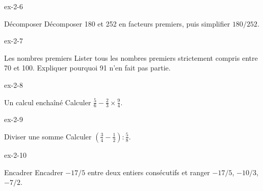 \begin{blocLivre}{ex-2-6}\begin{exercice}[2]{Décomposer}
Décomposer 180 et 252 en facteurs premiers, puis simplifier $180/252$.
\label{fig-ex-2-6}
\end{exercice}\end{blocLivre}
\begin{blocLivre}{ex-2-7}\begin{exercice}[2]{Les nombres premiers}
Lister tous les nombres premiers strictement compris entre 70 et 100. Expliquer pourquoi 91 n’en fait pas partie.
\end{exercice}\end{blocLivre}
\begin{blocLivre}{ex-2-8}\begin{exercice}[2]{Un calcul enchaîné}
Calculer $\frac56-\frac23\times\frac94$.
\end{exercice}\end{blocLivre}
\begin{blocLivre}{ex-2-9}\begin{exercice}[2]{Diviser une somme}
Calculer $\left(\frac34-\frac12\right):\frac58$.
\end{exercice}\end{blocLivre}
\begin{blocLivre}{ex-2-10}\begin{exercice}[2]{Encadrer}
Encadrer $-17/5$ entre deux entiers consécutifs et ranger $-17/5$, $-10/3$, $-7/2$.
\end{exercice}\end{blocLivre}

